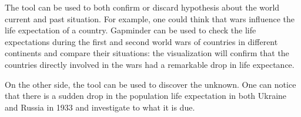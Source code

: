 The tool can be used to both confirm or discard hypothesis about the world current and past situation.
For example, one could think that wars influence the life expectation of a country.
Gapminder can be used to check the life expectations during the first and second world wars of countries in different continents and compare their situations:
the visualization will confirm that the countries directly involved in the wars had a remarkable drop in life expectance.

On the other side, the tool can be used to discover the unknown.
One can notice that there is a sudden drop in the population life expectation in both Ukraine and Russia in 1933 and investigate to what it is due.